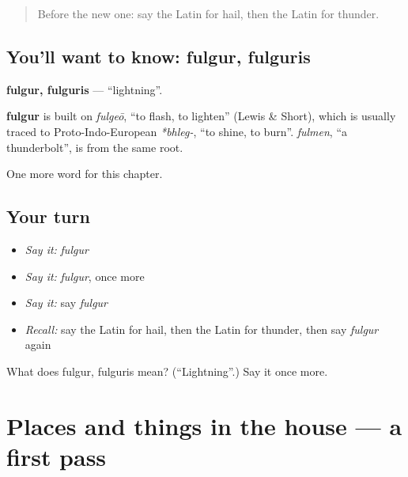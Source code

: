 \label{lesson:LA-C130-fulgur}



\begin{quote}
Before the new one: say the Latin for hail, then the Latin for thunder.
\end{quote}

\subsection*{You'll want to know: fulgur, fulguris}
\textbf{fulgur, fulguris} — \textquotedblleft{}lightning\textquotedblright{}.

\begin{cousinweb}
\textbf{fulgur} is built on \emph{fulgeō}, \textquotedblleft{}to flash, to lighten\textquotedblright{} (Lewis \& Short), which is usually traced to Proto-Indo-European \emph{*bhleg-}, \textquotedblleft{}to shine, to burn\textquotedblright{}. \emph{fulmen}, \textquotedblleft{}a thunderbolt\textquotedblright{}, is from the same root.
\end{cousinweb}

\begin{grammarlens}[title={What you've built}]
One more word for this chapter.
\end{grammarlens}

\subsection*{Your turn}
\begin{itemize}
\raggedright
  \item \emph{Say it:} \emph{fulgur}
  \item \emph{Say it:} \emph{fulgur}, once more
  \item \emph{Say it:} say \emph{fulgur}
  \item \emph{Recall:} say the Latin for hail, then the Latin for thunder, then say \emph{fulgur} again
\end{itemize}

\begin{tcolorbox}[breakable,colback=teal!4,colframe=teal!35!black,title={Before you move on}]
What does fulgur, fulguris mean? (\textquotedblleft{}Lightning\textquotedblright{}.) Say it once more.
\end{tcolorbox}
\section[(dialogue)]{Places and things in the house — a first pass}


